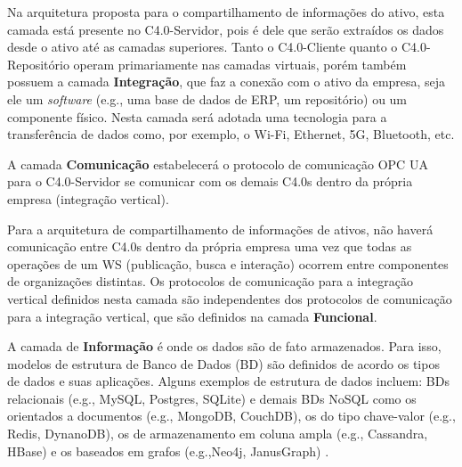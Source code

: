 	Na arquitetura proposta para o compartilhamento de informações do ativo, esta camada está presente no C4.0-Servidor, pois é dele que serão extraídos os dados desde o ativo até as camadas superiores. Tanto o C4.0-Cliente quanto o C4.0-Repositório operam primariamente nas camadas virtuais, porém também possuem a camada \textbf{Integração}, que faz a conexão com o ativo da empresa, seja ele um \textit{software} (e.g., uma base de dados de ERP, um repositório) ou um componente físico. Nesta camada será adotada uma tecnologia para a transferência de dados como, por exemplo, o Wi-Fi, Ethernet, 5G, Bluetooth, etc.
	
	A camada \textbf{Comunicação} estabelecerá o protocolo de comunicação OPC UA para o C4.0-Servidor se comunicar com os demais C4.0s dentro da própria empresa (integração vertical).
	
	Para a arquitetura de compartilhamento de informações de ativos, não haverá comunicação entre C4.0s dentro da própria empresa uma vez que todas as operações de um WS (publicação, busca e interação) ocorrem entre componentes de organizações distintas. Os protocolos de comunicação para a integração vertical definidos nesta camada são independentes dos protocolos de comunicação para a integração vertical, que são definidos na camada \textbf{Funcional}. %
	


	A camada de \textbf{Informação} é onde os dados são de fato armazenados. Para isso, modelos de estrutura de Banco de Dados (BD) são definidos de acordo os tipos de dados e suas aplicações. Alguns exemplos de estrutura de dados incluem: BDs relacionais (e.g., MySQL, Postgres, SQLite) \cite{morris2017relationaldatabase} e demais BDs NoSQL como os orientados a documentos (e.g., MongoDB, CouchDB), os do tipo chave-valor (e.g., Redis, DynanoDB), os de armazenamento em coluna ampla (e.g., Cassandra, HBase) e os baseados em grafos (e.g.,Neo4j, JanusGraph) \cite{schaefer2019nosql}.
	
